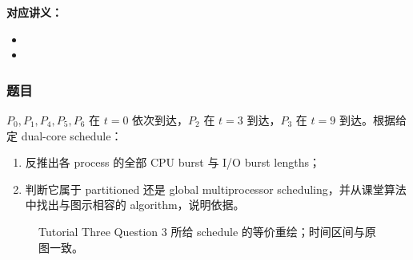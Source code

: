 
\textbf{对应讲义：}
\begin{itemize}[leftmargin=2em]
  \item {}
  \item {}
\end{itemize}

\subsubsection*{题目}

$P_0,P_1,P_4,P_5,P_6$ 在 $t=0$ 依次到达，$P_2$ 在 $t=3$ 到达，$P_3$ 在 $t=9$ 到达。根据给定 dual-core schedule：

\begin{enumerate}[label=(\alph*)]
  \item 反推出各 process 的全部 CPU burst 与 I/O burst lengths；
  \item 判断它属于 partitioned 还是 global multiprocessor scheduling，并从课堂算法中找出与图示相容的 algorithm，说明依据。
\end{enumerate}

\begin{figure}[htbp]
  \centering
  \resizebox{0.92\textwidth}{!}{}
  \caption{Tutorial Three Question 3 所给 schedule 的等价重绘；时间区间与原图一致。}
  \label{fig:sc2005-tut03-q3-schedule}
\end{figure}

